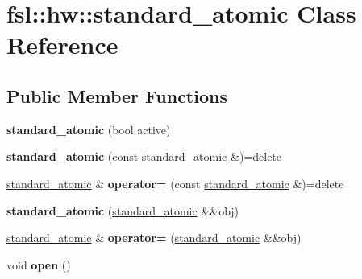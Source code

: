 \hypertarget{classfsl_1_1hw_1_1standard__atomic}{}\section{fsl\+::hw\+::standard\+\_\+atomic Class Reference}
\label{classfsl_1_1hw_1_1standard__atomic}
\subsection*{Public Member Functions}
\begin{DoxyCompactItemize}
\item 
\mbox{\label{classfsl_1_1hw_1_1standard__atomic_aaeffde9b53c6d3b433d8cdad4aed059e}} 
{\bfseries standard\+\_\+atomic} (bool active)
\item 
\mbox{\label{classfsl_1_1hw_1_1standard__atomic_a99fd71f5ac04ad0e8d24aae5691869a7}} 
{\bfseries standard\+\_\+atomic} (const \mbox{\hyperlink{classfsl_1_1hw_1_1standard__atomic}{standard\+\_\+atomic}} \&)=delete
\item 
\mbox{\label{classfsl_1_1hw_1_1standard__atomic_ae299fb175a60aabb0e1b72bd5132587d}} 
\mbox{\hyperlink{classfsl_1_1hw_1_1standard__atomic}{standard\+\_\+atomic}} \& {\bfseries operator=} (const \mbox{\hyperlink{classfsl_1_1hw_1_1standard__atomic}{standard\+\_\+atomic}} \&)=delete
\item 
\mbox{\label{classfsl_1_1hw_1_1standard__atomic_a798aa782283c7fc7a254b72a468c2bc6}} 
{\bfseries standard\+\_\+atomic} (\mbox{\hyperlink{classfsl_1_1hw_1_1standard__atomic}{standard\+\_\+atomic}} \&\&obj)
\item 
\mbox{\label{classfsl_1_1hw_1_1standard__atomic_ac9b711d90fd9575cd5ba80642f25e096}} 
\mbox{\hyperlink{classfsl_1_1hw_1_1standard__atomic}{standard\+\_\+atomic}} \& {\bfseries operator=} (\mbox{\hyperlink{classfsl_1_1hw_1_1standard__atomic}{standard\+\_\+atomic}} \&\&obj)
\item 
\mbox{\label{classfsl_1_1hw_1_1standard__atomic_a6f8cd09f7d0e8d22c24dba3d44c703ad}} 
void {\bfseries open} ()

\end{DoxyCompactItemize}
